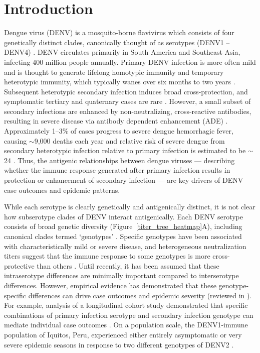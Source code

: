 \documentclass[11pt,oneside,letterpaper]{article}
\begin{document}
\section*{Introduction}
Dengue virus (DENV) is a mosquito-borne flavivirus which consists of four genetically distinct clades, canonically thought of as serotypes (DENV1 -- DENV4) \citep{lanciotti1997molecular}.
DENV circulates primarily in South America and Southeast Asia, infecting 400 million people annually.
Primary DENV infection is more often mild and is thought to generate lifelong homotypic immunity and temporary heterotypic immunity, which typically wanes over six months to two years \citep{sabin1952research,reich2013interactions,katzelnick2016neutralizing}.
Subsequent heterotypic secondary infection induces broad cross-protection, and symptomatic tertiary and quaternary cases are rare  \citep{gibbons2007analysis,olkowski2013reduced}.
However, a small subset of secondary infections are enhanced by non-neutralizing, cross-reactive antibodies, resulting in severe disease via antibody dependent enhancement (ADE) \citep{halstead1979vivo,katzelnick2017antibody,sangkawibha1984risk,salje2018reconstruction}.
Approximately 1--3\% of cases progress to severe dengue hemorrhagic fever, causing $\sim$9,000 deaths each year \citep{bhatt2013global,stanaway2016global} and relative risk of severe dengue from secondary heterotypic infection relative to primary infection is estimated to be $\sim$24 \citep{mizumoto2014risk}.
Thus, the antigenic relationships between dengue viruses --- describing whether the immune response generated after primary infection results in protection or enhancement of secondary infection --- are key drivers of DENV case outcomes and epidemic patterns.

While each serotype is clearly genetically and antigenically distinct, it is not clear how subserotype clades of DENV interact antigenically.
Each DENV serotype consists of broad genetic diversity (Figure~\ref{titer_tree_heatmap}A), including canonical clades termed `genotypes'  \citep{rico1990molecular,twiddy2003inferring}.
Specific genotypes have been associated with characteristically mild or severe disease, and heterogeneous neutralization titers suggest that the immune response to some genotypes is more cross-protective than others \citep{gentry1982identification,russell1967dengue}.
Until recently, it has been assumed that these intraserotype differences are minimally important compared to interserotype differences.
However, empirical evidence has demonstrated that these genotype-specific differences can drive case outcomes and epidemic severity (reviewed in \citet{holmes2003origin}).
For example, analysis of a longitudinal cohort study demonstrated that specific combinations of primary infection serotype and secondary infection genotype can mediate individual case outcomes \citep{ohainle2011dynamics}.
On a population scale, the DENV1-immune population of Iquitos, Peru, experienced either entirely asymptomatic or very severe epidemic seasons in response to two different genotypes of DENV2 \citep{kochel2002effect}.
\end{document}
